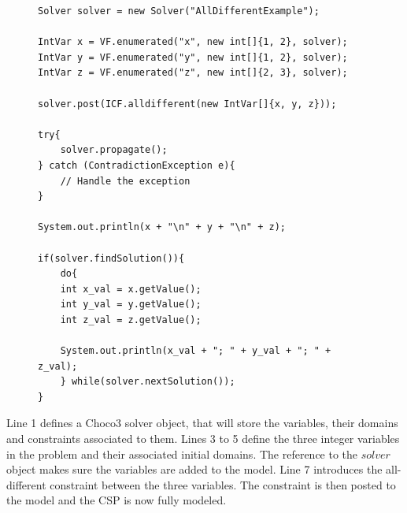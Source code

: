 \documentclass{l4proj}
\begin{document}

\begin{figure}[H]
%
\begin{lstlisting}
Solver solver = new Solver("AllDifferentExample");

IntVar x = VF.enumerated("x", new int[]{1, 2}, solver); 
IntVar y = VF.enumerated("y", new int[]{1, 2}, solver);
IntVar z = VF.enumerated("z", new int[]{2, 3}, solver);

solver.post(ICF.alldifferent(new IntVar[]{x, y, z}));

try{
    solver.propagate();
} catch (ContradictionException e){
    // Handle the exception
}

System.out.println(x + "\n" + y + "\n" + z);

if(solver.findSolution()){
    do{
	int x_val = x.getValue();
	int y_val = y.getValue();
	int z_val = z.getValue();

	System.out.println(x_val + "; " + y_val + "; " + z_val);
    } while(solver.nextSolution());
}
\end{lstlisting}
\label{choco3code}
\end{figure}
 
\noindent Line 1 defines a Choco3 solver object, that will store the variables, their domains and constraints associated to them. Lines 3 to 5 define the three integer variables in the problem and their associated initial domains. The reference to the $solver$ object makes sure the variables are added to the model. Line 7 introduces the all-different constraint between the three variables. The constraint is then posted to the model and the CSP is now fully modeled.
\end{document}
